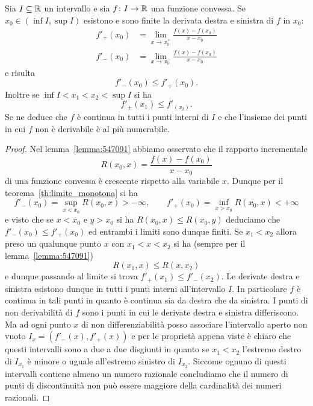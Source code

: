 \begin{theorem}
  Sia $I\subseteq \mathbb R$ un intervallo e sia $f\colon I \to \mathbb R$ una funzione convessa.
  Se $x_0\in (\inf I, \sup I)$ esistono e sono finite la derivata destra 
  e sinistra di $f$ in $x_0$:
  \begin{align*}
    f'_+(x_0) &= \lim_{x\to x_0^+} \frac{f(x)-f(x_0)}{x-x_0}\\
    f'_-(x_0)  &= \lim_{x\to x_0^-} \frac{f(x)-f(x_0)}{x-x_0}  
  \end{align*}
  e risulta
  \[
    f'_-(x_0) \le f'_+(x_0).
  \]
  Inoltre se $\inf I < x_1 < x_2 < \sup I$ si ha 
  \[
    f'_+(x_1) \le f'_(x_2).
  \]
  Se ne deduce che $f$ è continua in tutti i punti interni di $I$ 
  e che l'insieme dei punti in cui $f$ non è derivabile 
  è al più numerabile.
  \end{theorem}
  \begin{proof}
    Nel lemma~\ref{lemma:547091} abbiamo osservato che il rapporto incrementale
    \[
      R(x_0,x) = \frac{f(x)-f(x_0)}{x-x_0}
    \] 
    di una funzione convessa è crescente rispetto alla variabile $x$. 
    Dunque per il teorema~\ref{th:limite_monotona} si 
    ha 
    \[
      f'_-(x_0) = \sup_{x<x_0} R(x_0,x)>-\infty, \qquad 
      f'_+(x_0) = \inf_{x>x_0} R(x_0,x)<+\infty
    \]
    e visto che se $x<x_0$ e $y>x_0$ si ha $R(x_0,x)\le R(x_0,y)$ 
    deduciamo che $f'_-(x_0)\le f'_+(x_0)$ ed entrambi i limiti 
    sono dunque finiti. Se $x_1 < x_2$ allora preso un qualunque 
    punto $x$ con $x_1<x<x_2$ si ha (sempre per il lemma~\ref{lemma:547091})
    \[
      R(x_1,x) \le R(x,x_2)
    \]
    e dunque passando al limite si trova $f'_+(x_1) \le f'_-(x_2)$.
    Le derivate destra e sinistra esistono dunque in tutti i punti interni 
    all'intervallo $I$. 
    In particolare $f$ è continua in tali punti in quanto è continua sia da destra 
    che da sinistra.
    I punti di non derivabilità di $f$ sono i punti in cui 
    le derivate destra e sinistra differiscono. 
    Ma ad ogni punto $x$ di non differenziabilità 
    posso associare l'intervallo aperto non vuoto $I_x = (f'_-(x),f'_+(x))$ e per 
    le proprietà appena viste è chiaro che questi intervalli sono a due a due disgiunti
    in quanto se $x_1<x_2$ l'estremo destro di $I_{x_1}$ è minore o uguale all'estremo 
    sinistro di $I_{x_2}$.
    Siccome ognuno di questi intervalli contiene almeno un numero razionale concludiamo che 
    il numero di punti di discontinuità non può essere maggiore della cardinalità 
    dei numeri razionali.
  \end{proof}
  
